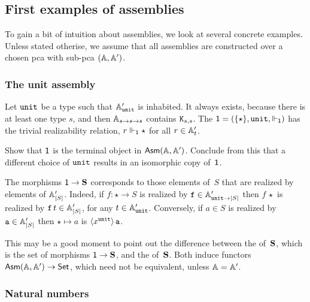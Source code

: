 \subsection{First examples of assemblies}
\label{sec:examples-assemblies}

To gain a bit of intuition about assemblies, we look at several concrete examples. Unless stated otherise, we assume that all assemblies are constructed over a chosen pca with sub-pca $(\mathbb{A}, \mathbb{A}')$.

\subsubsection{The unit assembly}
\label{sec:asm-unit}

Let $\mathtt{unit}$ be a type such that $\mathbb{A}'_{\mathtt{unit}}$ is inhabited.
It always exists, because there is at least one type $s$, and then
$\mathbb{A}_{s \to s \to s}$ contains $\mathtt{K}_{s,s}$.
%
The  $\mathsf{1} = (\{\star\}, \mathtt{unit}, {\Vdash_{\mathsf{1}}})$ has the trivial realizability relation, $r \Vdash_{\mathsf{1}} \star$ for all $r \in \mathbb{A}'_{t}$.

\begin{exercise}
  Show that $\mathsf{1}$ is the terminal object
  in $\mathsf{Asm}(\mathbb{A},\mathbb{A}')$. Conclude from this that a different choice of $\mathtt{unit}$ results in an isomorphic copy of~$\mathsf{1}$.
\end{exercise}

The morphisms $\mathsf{1} \to \mathbf{S}$ corresponds to those elements of~$S$ that are realized by elements of $\mathbb{A}'_{|S|}$. Indeed, if $f : \star \to S$ is realized by $\mathtt{f} \in \mathbb{A}'_{\mathtt{unit} \to |S|}$ then $f \, \star$ is realized by $\mathtt{f} \, t \in \mathbb{A}'_{|S|}$, for any $t \in \mathbb{A}'_{\mathtt{unit}}$. Conversely, if $a \in S$ is realized by $\mathtt{a} \in \mathbb{A}'_{|S|}$ then $\star \mapsto a$ is $\langle x^{\mathtt{unit}} \rangle\,{\mathtt{a}}$.

This may be a good moment to point out the difference between the  of~$\mathbf{S}$, which is the set of morphisms $\mathsf{1} \to \mathbf{S}$, and the  of~$\mathbf{S}$. Both induce functors $\mathsf{Asm}(\mathbb{A},\mathbb{A}') \to \mathsf{Set}$, which need not be equivalent, unless $\mathbb{A} = \mathbb{A}'$.


\subsubsection{Natural numbers}
\label{sec:asm-natural-numbers}

